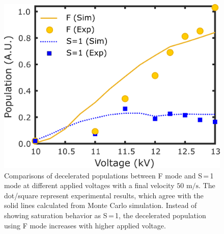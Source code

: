 \documentclass[%
 reprint,
 amsmath,amssymb,
 aps,
prl,
]{revtex4-1}
\begin{document}
\begin{figure}[t]
\includegraphics[width=\linewidth]{Figure4.png}
\vspace{-15pt}
\caption{\label{fig:voltage}
Comparisons of decelerated populations between F mode and S\,=\,1 mode at different applied voltages with a final velocity $50 \text{ m/s}$. 
The dot/square represent experimental results, which agree with the solid lines calculated from Monte Carlo simulation. 
Instead of showing saturation behavior as S\,=\,1, the decelerated population using F mode increases with higher applied voltage.
\vspace{-15pt}}
\end{figure}


\end{document}
